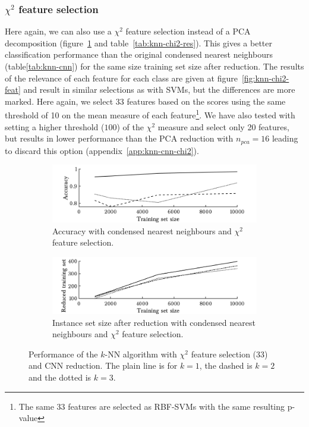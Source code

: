 \subsubsection{$\chi^2$ feature selection}
Here again, we can also use a $\chi^2$ feature selection instead of a PCA decomposition (figure~\ref{fig:knn-chi2-res} and table~\ref{tab:knn-chi2-res}). This gives a better classification performance than the original condensed nearest neighbours (table\ref{tab:knn-cnn}) for the same size training set size after reduction. The results of the relevance of each feature for each class are given at figure~\ref{fig:knn-chi2-feat} and result in similar selections as with SVMs, but the differences are more marked. Here again, we select 33 features based on the scores using the same threshold of 10 on the mean measure of each feature\footnote{The same 33 features are selected as RBF-SVMs with the same resulting p-value}. We have also tested with setting a higher threshold ($100$) of the $\chi^2$ measure and select only 20 features, but results in lower performance than the PCA reduction with $n_{pca}=16$ leading to discard this option (appendix~\ref{app:knn-cnn-chi2}).

\begin{figure}[h!]
        \begin{subfigure}[b]{.97\textwidth}  
            \centering 
            \includegraphics[width=.98\textwidth]{parts/chap-4/img-knn/cnn-chi2/acc.png}
            \caption{Accuracy with condensed nearest neighbours and $\chi^2$ feature selection.}
        \end{subfigure}
        \vfill
        \begin{subfigure}[b]{.97\textwidth}  
            \centering 
            \includegraphics[width=.98\textwidth]{parts/chap-4/img-knn/cnn-chi2/red.png}
            \caption{Instance set size after reduction with condensed nearest neighbours and $\chi^2$ feature selection.} 
        \end{subfigure}
        \caption[Results of CNN with $\chi^2$ feature selection.]{Performance of the $k$-NN algorithm with $\chi^2$ feature selection (33) and CNN reduction. The plain line is for $k=1$, the dashed is $k=2$ and the dotted is $k=3$.}
        \label{fig:knn-chi2-res}
\end{figure}

